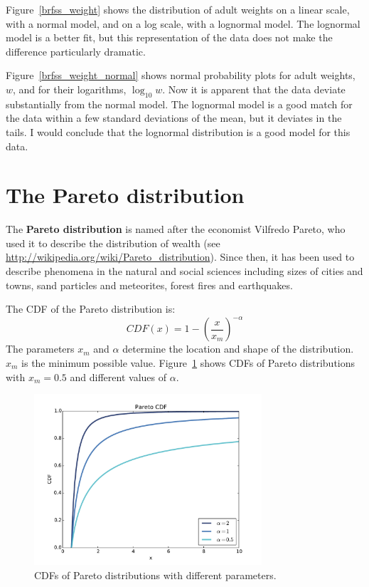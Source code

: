 \documentclass[12pt]{book}
\begin{document}
Figure~\ref{brfss_weight} shows the distribution of adult weights on a
linear scale, with a normal model, and on a log scale, with a
lognormal model.  The lognormal model is a better fit, but this
representation of the data does not make the difference particularly
dramatic.   

Figure~\ref{brfss_weight_normal} shows normal probability plots
for adult weights, $w$, and for their logarithms, $\log_{10} w$.
Now it is apparent that the data deviate substantially from the
normal model.  The lognormal model is a good match for the data
within a few standard deviations of the mean, but it deviates in
the tails.  I would conclude that the lognormal distribution is
a good model for this data.
 
 
 


\section{The Pareto distribution}

The {\bf Pareto distribution} is named after the economist Vilfredo Pareto,
who used it to describe the distribution of wealth (see
\url{http://wikipedia.org/wiki/Pareto_distribution}).  Since then, it
has been used to describe phenomena in the natural and social sciences
including sizes of cities and towns, sand particles and meteorites,
forest fires and earthquakes.  

The CDF of the Pareto distribution is:
%
\[ CDF(x) = 1 - \left( \frac{x}{x_m} \right) ^{-\alpha} \]
%
The parameters $x_{m}$ and $\alpha$ determine the location and shape
of the distribution. $x_{m}$ is the minimum possible value.
Figure~\ref{analytic_pareto_cdf} shows CDFs of Pareto
distributions with $x_{m} = 0.5$ and different values
of $\alpha$.

\begin{figure}
\centerline{\includegraphics[height=2.5in]{figs/analytic_pareto_cdf.pdf}}
\caption{CDFs of Pareto distributions with different parameters.}
\label{analytic_pareto_cdf}
\end{figure}
\end{document}
